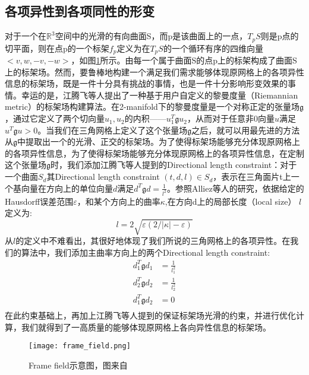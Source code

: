 \subsection{各项异性到各项同性的形变}
对于一个在$\mathbb{R}^3$空间中的光滑的有向曲面S，而p是该曲面上的一点，$T_pS$则是p点的切平面，则在点p的一个标架$f_p$定义为在$T_pS$的一个循环有序的四维向量$<v,w,−v,−w>$，如图\ref{fig:frame-field}所示。由每一个属于曲面S的点p上的标架构成了曲面S上的标架场。然而，要鲁棒地构建一个满足我们需求能够体现原网格上的各项异性信息的标架场，既是一件十分具有挑战的事情，也是一件十分影响形变效果的事情。幸运的是，江腾飞等人提出了一种基于用户自定义的黎曼度量（Riemannian metric）的标架场构建算法\cite{frame-field-gen}。在2-manifold下的黎曼度量是一个对称正定的张量场$\mathfrak{g}$，通过它定义了两个切向量$u_1, u_2$的内积——$u_1^T \mathfrak{g} u_2$，从而对于任意非0向量$u$满足$u^T \mathfrak{g} u>0$。当我们在三角网格上定义了这个张量场$\mathfrak{g}$之后，就可以用最先进的方法从$\mathfrak{g}$中提取出一个的光滑、正交的标架场。为了使得标架场能够充分体现原网格上的各项异性信息，为了使得标架场能够充分体现原网格上的各项异性信息，在定制这个张量场$\mathfrak{g}$时，我们添加江腾飞等人提到的Directional length constraint：对于一个曲面$S_d$其Directional length constraint $(t, d, l) \in S_d$，表示在三角面片t上一个基向量在方向上的单位向量$d$满足$d^T \mathfrak{g} d = \frac{1}{l^2}$。参照Alliez等人的研究\cite{remesh-length}，依据给定的Hausdorff误差范围$\varepsilon$，和某个方向上的曲率$\kappa$,在方向d上的局部长度（local size） $l$定义为:
\begin{equation}
  l = 2 \sqrt{\varepsilon(2/|\kappa| - \varepsilon)}
\end{equation}
从$l$的定义中不难看出，其很好地体现了我们所说的三角网格上的各项异性。在我们的算法中，我们添加主曲率方向上的两个Directional length constraint:
\begin{equation}
  \begin{split}
    d_1^T \mathfrak{g} d_1 &= \frac{1}{l_1^2}\\
    d_2^T \mathfrak{g} d_2 &= \frac{1}{l_2^2}\\
    d_1^T \mathfrak{g} d_2 &= 0\\
  \end{split}
\end{equation}
在此约束基础上，再加上江腾飞等人提到的保证标架场光滑的约束，并进行优化计算，我们就得到了一高质量的能够体现原网格上各向异性信息的标架场。\par
\begin{figure}[htbp]
    \centering
    \texttt{[image: frame\_field.png]}
    \caption[Frame field]{Frame field示意图，图来自\cite{isotopic-appro}}
    \label{fig:frame-field}
\end{figure}
